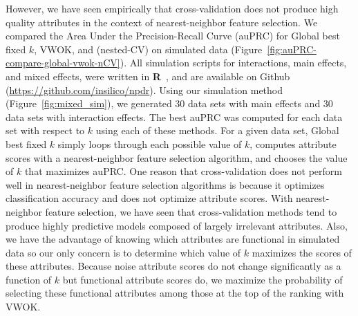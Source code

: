 \documentclass[10pt,letterpaper]{article}
\begin{document}
However, we have seen empirically that cross-validation does not produce high quality attributes in the context of nearest-neighbor feature selection. We compared the Area Under the Precision-Recall Curve (auPRC) for Global best fixed $k$, VWOK, and (nested-CV) on simulated data (Figure~\ref{fig:auPRC-compare-global-vwok-nCV}). All simulation scripts for interactions, main effects, and mixed effects, were written in \textbf{\textsf{R}}~\cite{R}, and are available on Github (\url{https://github.com/insilico/npdr}). Using our simulation method (Figure~\ref{fig:mixed_sim}), we generated 30 data sets with main effects and 30 data sets with interaction effects. The best auPRC was computed for each data set with respect to $k$ using each of these methods. For a given data set, Global best fixed $k$ simply loops through each possible value of $k$, computes attribute scores with a nearest-neighbor feature selection algorithm, and chooses the value of $k$ that maximizes auPRC. One reason that cross-validation does not perform well in nearest-neighbor feature selection algorithms is because it optimizes classification accuracy and does not optimize attribute scores. With nearest-neighbor feature selection, we have seen that cross-validation methods tend to produce highly predictive models composed of largely irrelevant attributes. Also, we have the advantage of knowing which attributes are functional in simulated data so our only concern is to determine which value of $k$ maximizes the scores of these attributes. Because noise attribute scores do not change significantly as a function of $k$ but functional attribute scores do, we maximize the probability of selecting these functional attributes among those at the top of the ranking with VWOK. 
\end{document}
